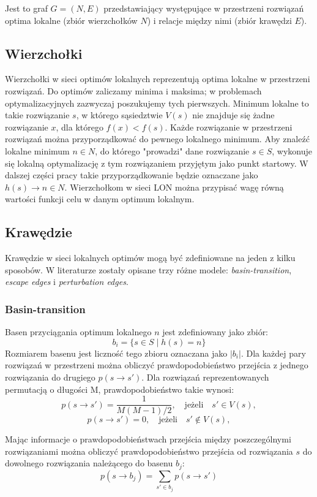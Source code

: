 Jest to graf $G = (N, E)$ przedstawiający występujące w przestrzeni rozwiązań optima lokalne (zbiór wierzchołków $N$)
i relacje między nimi (zbiór krawędzi $E$).

\subsection{Wierzchołki}
Wierzchołki w sieci optimów lokalnych reprezentują optima lokalne w przestrzeni rozwiązań.
Do optimów zaliczamy minima i maksima; w problemach optymalizacyjnych zazwyczaj poszukujemy tych pierwszych.
Minimum lokalne to takie rozwiązanie $s$, w którego sąsiedztwie $V(s)$ nie znajduje się żadne rozwiązanie $x$, dla którego $f(x) < f(s)$.
Każde rozwiązanie w przestrzeni rozwiązań można przyporządkować do pewnego lokalnego minimum.
Aby znaleźć lokalne minimum $n \in{N}$, do którego "prowadzi" dane rozwiązanie $s\in{S}$, wykonuje się lokalną optymalizację
z tym rozwiązaniem przyjętym jako punkt startowy.
W dalszej części pracy takie przyporządkowanie będzie oznaczane jako $h(s) \rightarrow n\in{N}$.
Wierzchołkom w sieci LON można przypisać wagę równą wartości funkcji celu w danym optimum lokalnym.

\subsection{Krawędzie}
Krawędzie w sieci lokalnych optimów mogą być zdefiniowane na jeden z kilku sposobów.
W literaturze\cite{DBLP:journals/corr/OchoaVDT14}\cite{DBLP:conf/gecco/TeixeiraP22} zostały opisane trzy różne modele:
\textit{basin-transition}, \textit{escape edges} i \textit{perturbation edges}.

\subsubsection{Basin-transition}
Basen przyciągania optimum lokalnego $n$ jest zdefiniowany jako zbiór:
$$b_i = \{s\in{S} \mid h(s) = n\}$$
Rozmiarem basenu jest liczność tego zbioru oznaczana jako $|b_i|$.
Dla każdej pary rozwiązań w przestrzeni można obliczyć prawdopodobieństwo przejścia z jednego rozwiązania do drugiego $p(s \rightarrow s')$.
Dla rozwiązań reprezentowanych permutacją o długości M, prawdopodobieństwo takie wynosi:
$$p(s \rightarrow s') = \frac{1}{M(M-1)/2}, \quad \text{jeżeli} \quad s'\in{V(s)},$$
$$p(s \rightarrow s') = 0, \quad \text{jeżeli} \quad s'\notin{V(s)},$$

Mając informacje o prawdopodobieństwach przejścia między poszczególnymi rozwiązaniami można obliczyć prawdopodobieństwo
przejścia od rozwiązania $s$ do dowolnego rozwiązania należącego do basenu $b_j$:
$$p(s \rightarrow b_j) = \sum_{s'\in{b_j}} p(s \rightarrow s')$$

